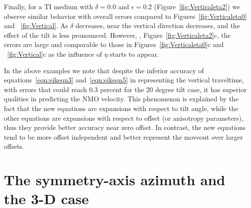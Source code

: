 Finally, for a TI medium with $\delta=0.0$ and $\epsilon=0.2$
(Figure~\ref{fig:Verticaleta2}) we observe
similar behavior with   overall  errors compared to
Figures~\ref{fig:Verticaleta0} and ~\ref{fig:Vertical}. As $\delta$
decreases,  near the vertical direction decreases, and the effect of the
tilt is less pronounced. However, ,
Figure~\ref{fig:Verticaleta2}c, the errors are large and comparable
to those in Figures~\ref{fig:Verticaleta0}c and ~\ref{fig:Vertical}c as the influence
of $\eta$ starts to appear.

In the above examples we note that despite the inferior accuracy of
equations~\ref{eqn:eikeqn3} and~\ref{eqn:eikeqn5} in representing
the vertical traveltime, with  errors that could reach 0.3
percent for the 20 degree tilt case, it has superior qualities in
predicting the NMO velocity. This phenomenon is
explained by the fact that the new equations are expansions with
respect to tilt angle, while the other equations are expansions with respect
to offset (or anisotropy parameters), thus they provide better accuracy near zero offset. In contrast,
the new equations tend to be more offset independent and better
represent the moveout over larger offsets.


\section{The symmetry-axis azimuth and the 3-D case}

